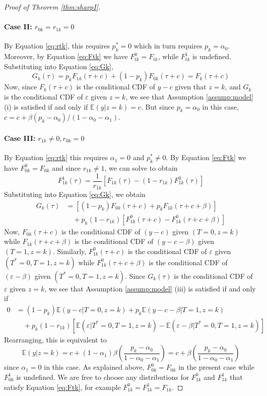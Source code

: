 \begin{proof}[Proof of Theorem \ref{thm:sharpI}]
\paragraph{Case II: $r_{0k} = r_{1k} = 0$}
By Equation \ref{eq:rtk}, this requires $p_k^* = 0$ which in turn requires $p_k = \alpha_0$.
Moreover, by Equation \ref{eq:Ftk} we have $F^0_{tk} = F_{tk}$, while $F^1_{tk}$ is undefined.
Substituting into Equation \ref{eq:Gk},
\[
  G_k(\tau) = p_k F_{1k}(\tau + c) + (1 - p_k) F_{0k}(\tau + c) = F_k(\tau + c)
\]
Now, since $F_k(\tau + c)$ is the conditional CDF of $y-c$ given that $z=k$, and $G_k$ is the conditional CDF of $\varepsilon$ given $z=k$,
we see that Assumption \ref{assump:model} (i) is satisfied if and only if $\mathbb{E}(y|z=k) = c$.
But since $p_k = \alpha_0$ in this case, $c = c + \beta (p_k - \alpha_0)/(1 - \alpha_0 - \alpha_1)$.

\paragraph{Case III: $r_{1k}\neq 0, r_{0k} = 0$}
By Equation \ref{eq:rtk} this requires $\alpha_1 = 0$ and $p_k^* \neq 0$.
By Equation \ref{eq:Ftk} we have $F^0_{0k} = F_{0k}$ and since $r_{1k} \neq 1$, we can solve to obtain
\[
  F^1_{1k}(\tau) = \frac{1}{r_{1k}}\left[F_{1k}(\tau) - (1 - r_{1k})F^0_{1k}(\tau)\right]
\]
Substituting into Equation \ref{eq:Gk}, we obtain
\begin{align*}
  G_k(\tau) &= \left[ (1 - p_k)F_{0k}(\tau + c) + p_k F_{1k}(\tau + c + \beta) \right] \\ 
  &\quad + p_k(1 - r_{1k})\left[ F^0_{1k}(\tau + c) - F^0_{1k}(\tau + c + \beta) \right]
\end{align*}
Now, $F_{0k}(\tau + c)$ is the conditional CDF of $(y-c)$ given $(T=0,z=k)$ while $F_{1k}(\tau + c + \beta)$ is the conditional CDF of $(y-c-\beta)$ given $(T=1,z=k)$.
Similarly, $F^0_{1k}(\tau + c)$ is the conditional CDF of $\varepsilon$ given $(T^*=0,T = 1, z=k)$ while $F^0_{1k}(\tau + c + \beta)$ is the conditional CDF of $(\varepsilon - \beta)$ given $(T^*=0, T=1, z=k)$.
Since $G_k(\tau)$ is the conditional CDF of $\varepsilon$ given $z=k$, we see that Assumption \ref{assump:model} (iii) is satisfied if and only if
\begin{align*}
  0 &= (1 - p_k) \mathbb{E}(y-c|T=0,z=k) + p_k \mathbb{E}(y - c - \beta|T=1,z=k)\\
  &\quad + p_k(1 - r_{1k})\left[ \mathbb{E}(\varepsilon|T^*=0,T=1,z=k) - \mathbb{E}(\varepsilon - \beta|T^*=0,T=1,z=k) \right]
\end{align*}
Rearranging, this is equivalent to 
\[
  \mathbb{E}(y|z=k) = c + (1 - \alpha_1) \beta\left( \frac{p_k - \alpha_0}{1 - \alpha_0 - \alpha_1} \right) = c + \beta\left( \frac{p_k - \alpha_0}{1 - \alpha_0 - \alpha_1} \right)
\]
since $\alpha_1 = 0$ in this case.
As explained above, $F^0_{0k} = F_{0k}$ in the present case while $F^1_{0k}$ is undefined. 
We are free to choose any distributions for $F^{0}_{1k}$ and $F^{1}_{1k}$ that satisfy Equation \ref{eq:Ftk}, for example $F^{0}_{1k} = F^{1}_{1k} = F_{1k}$.


\end{proof}
